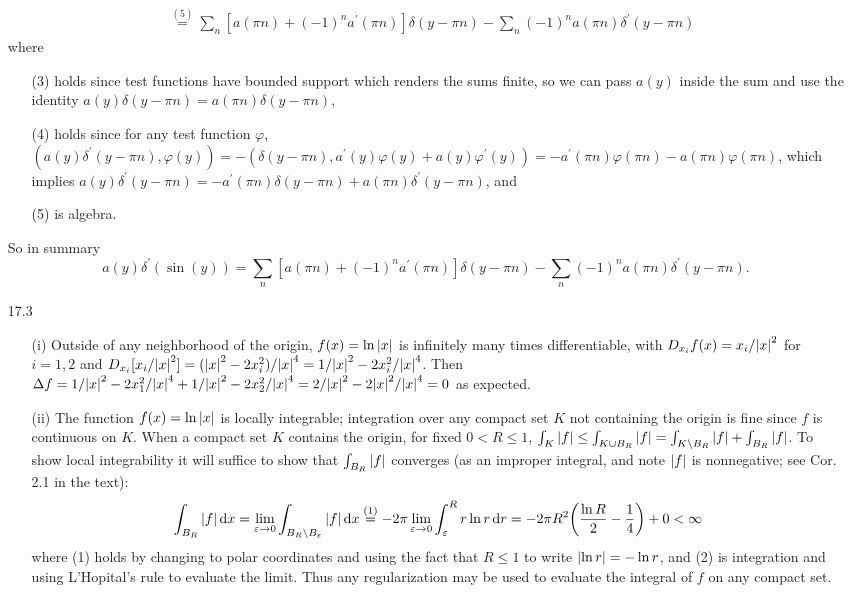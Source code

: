 \documentclass[11pt]{article}
\newcommand{\eq}[1]{\overset{(#1)}{=}}
\begin{document}
\begin{enumerate}
\begin{align*}
        &\eq{5} \sum_n [a(\pi n) + (-1)^n a^\prime(\pi n)]\delta(y-\pi n) - \sum_n (-1)^na(\pi n)\delta^\prime(y-\pi n)
    \end{align*} where \begin{enumerate}
        \item[(3)] holds since test functions have bounded support which renders the sums finite, so we can pass $a(y)$ inside the sum and use the identity $a(y)\delta(y-\pi n) = a(\pi n)\delta(y-\pi n)$,
        \item[(4)] holds since for any test function $\varphi$, $(a(y)\delta^\prime(y-\pi n),\varphi(y)) = -(\delta(y-\pi n),a^\prime(y)\varphi(y)+ a(y)\varphi^\prime(y)) = -a^\prime(\pi n)\varphi(\pi n) - a(\pi n)\varphi(\pi n)$, which implies $a(y)\delta^\prime(y-\pi n) = -a^\prime(\pi n)\delta(y-\pi n) + a(\pi n)\delta^\prime(y-\pi n)$, and
        \item[(5)] is algebra. 
    \end{enumerate} So in summary \[a(y)\delta^\prime(\sin(y)) = \sum_n [a(\pi n) + (-1)^n a^\prime(\pi n)]\delta(y-\pi n) - \sum_n (-1)^na(\pi n)\delta^\prime(y-\pi n).\]

    \hrulefill

    \item[17.3] \begin{enumerate}
        \item[(i)] Outside of any neighborhood of the origin, $f(x) = \ln\abs{x}$ is infinitely many times differentiable, with $D_{x_i}f(x) = x_i/\abs{x}^2$ for $i =1,2$ and $D_{x_i} [x_i/\abs{x}^2] = (\abs{x}^2-2x_i^2)/\abs{x}^4 = 1/\abs{x}^2-2x_i^2/\abs{x}^4$. Then $\Delta f = 1/\abs{x}^2-2x_1^2/\abs{x}^4+1/\abs{x}^2-2x_2^2/\abs{x}^4 = 2/\abs{x}^2-2\abs{x}^2/\abs{x}^4 = 0$ as expected.
        \item[(ii)] The function $f(x) = \ln\abs{x}$ is locally integrable; integration over any compact set $K$ not containing the origin is fine since $f$ is continuous on $K$. When a compact set $K$ contains the origin, for fixed $0<R\leq 1$, $\int_K\abs{f}\leq \int_{K\cup B_{R}} \abs{f} = \int_{K\setminus B_R}\abs{f} + \int_{B_R}\abs{f}$. To show local integrability it will suffice to show that $\int_{B_R}\abs{f}$ converges (as an improper integral, and note $\abs{f}$ is nonnegative; see Cor. 2.1 in the text): \[\int_{B_R}\abs{f}\dd{x} = \lim_{\varepsilon\to 0}\int_{B_R\setminus B_\varepsilon}\abs{f}\dd{x} \eq{1} -2\pi\lim_{\varepsilon\to 0}\int_\varepsilon^R r\ln r \dd{r} = -2\pi R^2\bigg(\frac{\ln R}{2}-\frac{1}{4}\bigg)+0< \infty\] where (1) holds by changing to polar coordinates and using the fact that $R\leq 1$ to write $\abs{\ln r} = -\ln r$, and (2) is integration and using L'Hopital's rule to evaluate the limit. Thus any regularization may be used to evaluate the integral of $f$ on any compact set.
        

\end{enumerate}
\end{enumerate}
\end{document}
